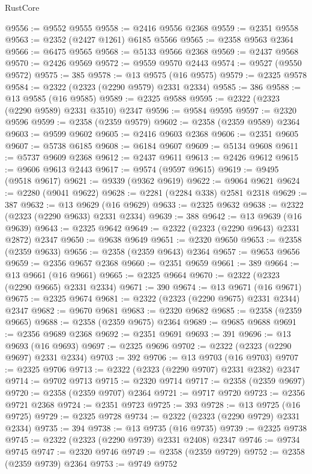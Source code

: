 \begin{lexlean}{RustCore}
\begin{coremodule}
@9556 := @9552 @9555
@9558 := @2416 @9556 @2368
@9559 := @2351 @9558
@9563 := @2352 (@2427 @1261) @6185 @5566
@9565 := @2358 @9563 @2364
@9566 := @6475 @9565
@9568 := @5133 @9566 @2368
@9569 := @2437 @9568
@9570 := @2426 @9569
@9572 := @9559 @9570 @2443
@9574 := @9527 (@9550 @9572)
@9575 := 385
@9578 := @13 @9575 (@16 @9575)
@9579 := @2325 @9578
@9584 := @2322 (@2323 (@2290 @9579) @2331 @2334)
@9585 := 386
@9588 := @13 @9585 (@16 @9585)
@9589 := @2325 @9588
@9595 := @2322 (@2323 (@2290 @9589) @2331 @3510) @2347
@9596 := @9584 @9595
@9597 := @2320 @9596
@9599 := @2358 (@2359 @9579)
@9602 := @2358 (@2359 @9589) @2364
@9603 := @9599 @9602
@9605 := @2416 @9603 @2368
@9606 := @2351 @9605
@9607 := @5738 @6185
@9608 := @6184 @9607
@9609 := @5134 @9608
@9611 := @5737 @9609 @2368
@9612 := @2437 @9611
@9613 := @2426 @9612
@9615 := @9606 @9613 @2443
@9617 := @9574 (@9597 @9615)
@9619 := @9495 (@9518 @9617)
@9621 := @9339 (@9362 @9619)
@9622 := @9064 @9621
@9624 := @2280 (@9041 @9622)
@9628 := @2281 (@2284 @338) @2581 @2318
@9629 := 387
@9632 := @13 @9629 (@16 @9629)
@9633 := @2325 @9632
@9638 := @2322 (@2323 (@2290 @9633) @2331 @2334)
@9639 := 388
@9642 := @13 @9639 (@16 @9639)
@9643 := @2325 @9642
@9649 := @2322 (@2323 (@2290 @9643) @2331 @2872) @2347
@9650 := @9638 @9649
@9651 := @2320 @9650
@9653 := @2358 (@2359 @9633)
@9656 := @2358 (@2359 @9643) @2364
@9657 := @9653 @9656
@9659 := @2356 @9657 @2368
@9660 := @2351 @9659
@9661 := 389
@9664 := @13 @9661 (@16 @9661)
@9665 := @2325 @9664
@9670 := @2322 (@2323 (@2290 @9665) @2331 @2334)
@9671 := 390
@9674 := @13 @9671 (@16 @9671)
@9675 := @2325 @9674
@9681 := @2322 (@2323 (@2290 @9675) @2331 @2344) @2347
@9682 := @9670 @9681
@9683 := @2320 @9682
@9685 := @2358 (@2359 @9665)
@9688 := @2358 (@2359 @9675) @2364
@9689 := @9685 @9688
@9691 := @2356 @9689 @2368
@9692 := @2351 @9691
@9693 := 391
@9696 := @13 @9693 (@16 @9693)
@9697 := @2325 @9696
@9702 := @2322 (@2323 (@2290 @9697) @2331 @2334)
@9703 := 392
@9706 := @13 @9703 (@16 @9703)
@9707 := @2325 @9706
@9713 := @2322 (@2323 (@2290 @9707) @2331 @2382) @2347
@9714 := @9702 @9713
@9715 := @2320 @9714
@9717 := @2358 (@2359 @9697)
@9720 := @2358 (@2359 @9707) @2364
@9721 := @9717 @9720
@9723 := @2356 @9721 @2368
@9724 := @2351 @9723
@9725 := 393
@9728 := @13 @9725 (@16 @9725)
@9729 := @2325 @9728
@9734 := @2322 (@2323 (@2290 @9729) @2331 @2334)
@9735 := 394
@9738 := @13 @9735 (@16 @9735)
@9739 := @2325 @9738
@9745 := @2322 (@2323 (@2290 @9739) @2331 @2408) @2347
@9746 := @9734 @9745
@9747 := @2320 @9746
@9749 := @2358 (@2359 @9729)
@9752 := @2358 (@2359 @9739) @2364
@9753 := @9749 @9752

\end{coremodule}
\end{lexlean}
